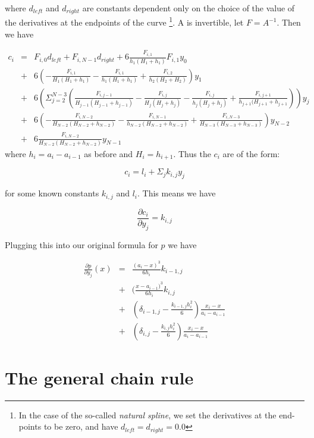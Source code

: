 \documentclass[a4paper]{article}
\begin{document}
where $d_{left}$ and $d_{right}$ are constants dependent only on the choice of the value of the derivatives at the endpoints of the curve \footnote{In the case of the so-called \emph{natural spline}, we set the derivatives at the end-points to be zero, and have $d_{left}=d_{right}=0.0$}. A is invertible, let $F = A^{-1}$. Then we have

\begin{eqnarray}
c_i &=& F_{i,0}d_{left} + F_{i,N-1}d_{right} +  6\frac{F_{i,1}}{h_1(H_1+h_1)}F_{i,1}y_0 \nonumber\\
&+& 6\left( -\frac{F_{i,1}}{H_1(H_1+h_1)} - \frac{F_{i,1}}{h_1(H_1+h_1)} + \frac{F_{i,2}}{h_2(H_2+H_2)}\right)y_1 \nonumber\\
&+& 6\left(\Sigma_{j=2}^{N-3}\left(\frac{F_{i,j-1}}{H_{j-1}(H_{j-1}+h_{j-1})} - \frac{F_{i,j}}{H_j(H_j+h_j)} - \frac{F_{i,j}}{h_j(H_j+h_j)} + \frac{F_{i,j+1}}{h_{j+1}(H_{j+1}+h_{j+1}}\right)\right)y_j \nonumber\\
&+& 6\left( -\frac{F_{i,N-2}}{H_{N-2}(H_{N-2}+h_{N-2})}-\frac{F_{i,N-1}}{h_{N-2}(H_{N-2}+h_{N-2})} + \frac{F_{i,N-3}}{H_{N-3}(H_{N-3}+h_{N-3})}\right)y_{N-2} \nonumber\\
&+& 6\frac{F_{i,N-2}}{H_{N-2}(H_{N-2}+h_{N-2})}y_{N-1} 
\end{eqnarray}
where $h_i=a_i-a_{i-1}$ as before and $H_i = h_{i+1}$. Thus the $c_i$ are of the form:

\begin{equation}
c_i = l_i + \Sigma_{j} k_{i,j}y_j
\end{equation}

for some known constants $k_{i,j}$ and $l_i$. This means we have

\begin{equation}
\frac{\partial c_i}{\partial y_j} = k_{i,j}
\end{equation}

Plugging this into our original formula for $p$ we have

\begin{eqnarray}
\frac{\partial p}{\partial y_j}(x) &=& \frac{(a_i-x)^3}{6h_i}k_{i-1,j} \nonumber\\
&+& (\frac{x-a_{i-1})^3}{6h_i}k_{i,j} \nonumber\\
&+& (\delta_{i-1,j} - \frac{k_{i-1,j}h_i^2}{6})\frac{x_i - x}{a_i-a_{i-1}} \nonumber\\
&+& (\delta_{i,j} - \frac{k_{i,j}h_i^2}{6})\frac{x_i-x}{a_i-a_{i-1}}
\end{eqnarray}

\section{The general chain rule} \label{app:the-chain-rule}
\end{document}

